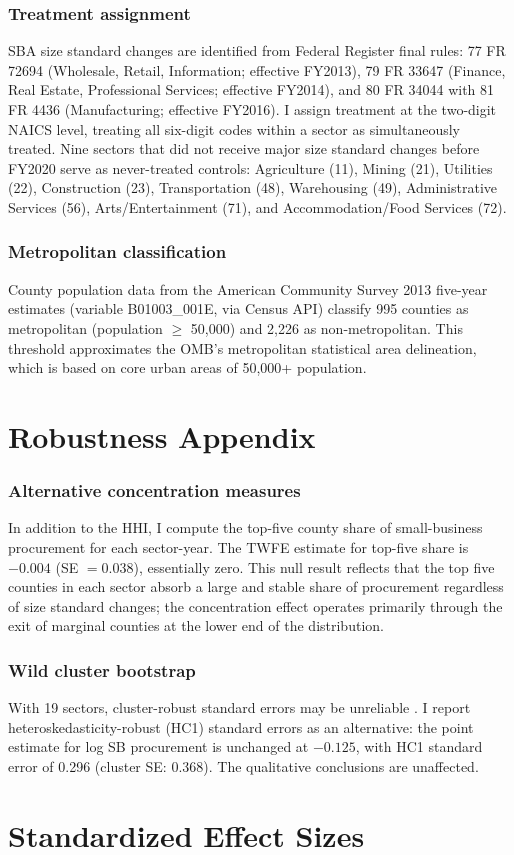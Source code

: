 \documentclass[12pt]{article}
\begin{document}
\subsubsection*{Treatment assignment} SBA size standard changes are identified from Federal Register final rules: 77 FR 72694 (Wholesale, Retail, Information; effective FY2013), 79 FR 33647 (Finance, Real Estate, Professional Services; effective FY2014), and 80 FR 34044 with 81 FR 4436 (Manufacturing; effective FY2016). I assign treatment at the two-digit NAICS level, treating all six-digit codes within a sector as simultaneously treated. Nine sectors that did not receive major size standard changes before FY2020 serve as never-treated controls: Agriculture (11), Mining (21), Utilities (22), Construction (23), Transportation (48), Warehousing (49), Administrative Services (56), Arts/Entertainment (71), and Accommodation/Food Services (72).

\subsubsection*{Metropolitan classification} County population data from the American Community Survey 2013 five-year estimates (variable B01003\_001E, via Census API) classify 995 counties as metropolitan (population $\geq$ 50,000) and 2,226 as non-metropolitan. This threshold approximates the OMB's metropolitan statistical area delineation, which is based on core urban areas of 50,000+ population.

\section{Robustness Appendix}

\subsubsection*{Alternative concentration measures} In addition to the HHI, I compute the top-five county share of small-business procurement for each sector-year. The TWFE estimate for top-five share is $-0.004$ (SE $= 0.038$), essentially zero. This null result reflects that the top five counties in each sector absorb a large and stable share of procurement regardless of size standard changes; the concentration effect operates primarily through the exit of marginal counties at the lower end of the distribution.

\subsubsection*{Wild cluster bootstrap} With 19 sectors, cluster-robust standard errors may be unreliable \citep{cameron2008}. I report heteroskedasticity-robust (HC1) standard errors as an alternative: the point estimate for log SB procurement is unchanged at $-0.125$, with HC1 standard error of 0.296 (cluster SE: 0.368). The qualitative conclusions are unaffected.

\section{Standardized Effect Sizes}
\label{sec:sde}


\end{document}
